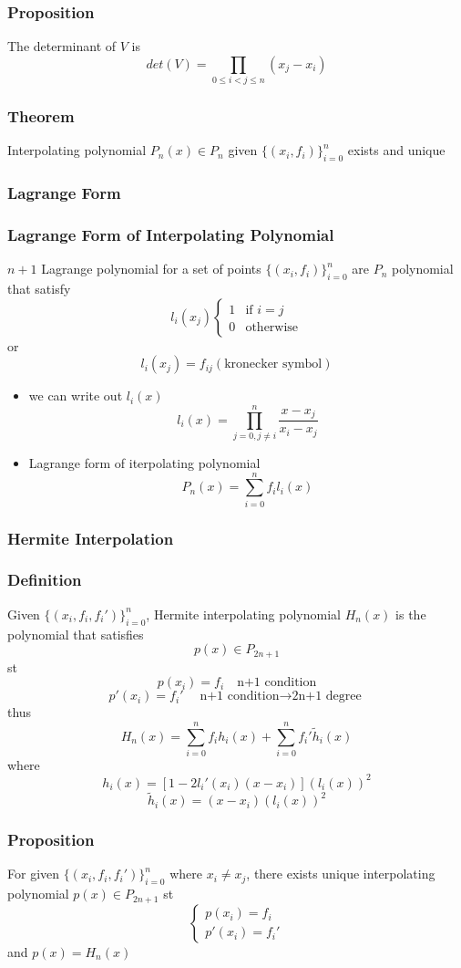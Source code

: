 \documentclass[11pt]{article}
\begin{document}
\subsubsection*{Proposition}
The determinant of $V$ is \[det(V) = \prod_{0\leq i<j\leq n}(x_j-x_i)\]
\subsubsection*{Theorem}
Interpolating polynomial $P_n(x)\in P_n$ given $\{(x_i,f_i)\}_{i=0}^n$ exists and unique 
\subsubsection{Lagrange Form}
\subsubsection*{Lagrange Form of Interpolating Polynomial}
$n+1$ Lagrange polynomial for a set of points $\{(x_i,f_i)\}_{i=0}^n$ are $P_n$ polynomial that satisfy
\[l_i(x_j)
  \begin{cases}
    1 &\text{if } i=j \\
    0 &\text{otherwise}
  \end{cases}
\] or \[l_i(x_j) = f_{ij}(\text{kronecker symbol})\]
\begin{itemize}
  \item we can write out $l_i(x)$ \[l_i(x) = \prod_{j=0,j\neq i}^{n}\frac{x-x_j}{x_i-x_j}\]
  \item Lagrange form of iterpolating polynomial \[P_n(x) = \sum_{i=0}^{n}f_il_i(x)\]
\end{itemize}
\subsubsection{Hermite Interpolation}
\subsubsection*{Definition}
Given $\{(x_i,f_i,f_i')\}_{i=0}^{n}$, Hermite interpolating polynomial $H_n(x)$ is the polynomial that satisfies
\[p(x)\in P_{2n+1}\] st \[p(x_i)=f_i\quad \text{n+1 condition}\] \[p'(x_i)=f_i'\quad \text{n+1 condition$\rightarrow$2n+1 degree}\]
thus \[H_n(x) = \sum_{i=0}^{n}f_ih_i(x) + \sum_{i=0}^{n}f_i'\tilde{h}_i(x)\]
where \[h_i(x) = [1-2l_i'(x_i)(x-x_i)](l_i(x))^2\]\[\tilde{h}_i(x) = (x-x_i)(l_i(x))^2\]
\subsubsection*{Proposition}
For given $\{(x_i,f_i,f_i')\}_{i=0}^n$ where $x_i\neq x_j$, there exists unique interpolating polynomial $p(x)\in P_{2n+1}$ st 
\[\begin{cases}
  p(x_i) = f_i \\
  p'(x_i) = f_i'
\end{cases}\]
and $p(x) = H_n(x)$
\end{document}
